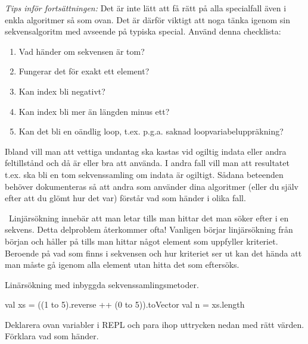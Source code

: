 \QUESTEND




\ifPreSolution
\begin{framed}
\noindent\emph{Tips inför fortsättningen:} Det är inte lätt att få rätt på alla specialfall även i enkla algoritmer så som  ovan. Det är därför viktigt att noga tänka igenom sin sekvensalgoritm med avseende på typiska special. Använd denna checklista:
\begin{enumerate}[noitemsep]
  \item Vad händer om sekvensen är tom?
  \item Fungerar det för exakt ett element?
  \item Kan index bli negativt?
  \item Kan index bli mer än längden minus ett?
  \item Kan det bli en oändlig loop, t.ex. p.g.a. saknad loopvariabeluppräkning?
\end{enumerate}
Ibland vill man att vettiga undantag ska kastas vid ogiltig indata eller andra feltillstånd och då är  eller  bra att använda. I andra fall vill man att resultatet t.ex. ska bli en tom sekvenssamling om indata är ogiltigt. Sådana beteenden behöver dokumenteras så att andra som använder dina algoritmer (eller du själv efter att du glömt hur det var) förstår vad som händer i olika fall.


\end{framed}
\fi





\QUESTBEGIN

\Task \what~Linjärsökning innebär att man letar tills man hittar det man söker efter i en sekvens. Detta delproblem återkommer ofta! Vanligen börjar linjärsökning från början och håller på tills man hittar något element som uppfyller kriteriet. Beroende på vad som finns i sekvensen och hur kriteriet ser ut kan det hända att man måste gå igenom alla element utan hitta det som eftersöks.

\Subtask Linärsökning med inbyggda sekvenssamlingsmetoder.
\begin{Code}
val xs = ((1 to 5).reverse ++ (0 to 5)).toVector
val n = xs.length
\end{Code}
Deklarera ovan variabler i REPL och para ihop uttrycken nedan med rätt värden. Förklara vad som händer.

\begin{ConceptConnections}

\end{ConceptConnections}

